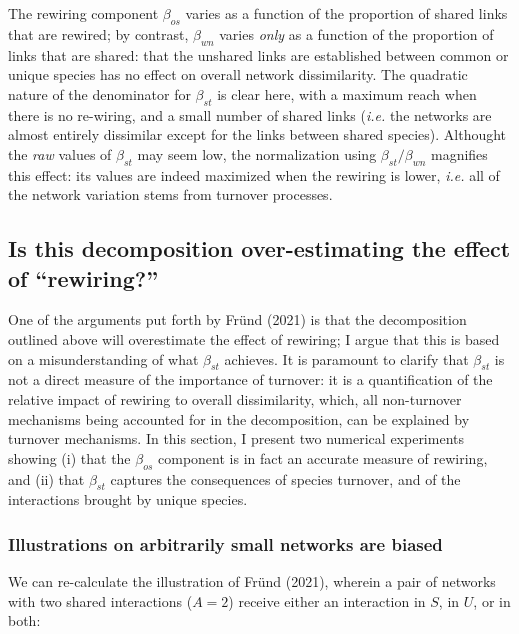 \documentclass[11pt]{article}
\begin{document}
The rewiring component \(\beta_{os}\) varies as a function of the
proportion of shared links that are rewired; by contrast, \(\beta_{wn}\)
varies \emph{only} as a function of the proportion of links that are
shared: that the unshared links are established between common or unique
species has no effect on overall network dissimilarity. The quadratic
nature of the denominator for \(\beta_{st}\) is clear here, with a
maximum reach when there is no re-wiring, and a small number of shared
links (\emph{i.e.} the networks are almost entirely dissimilar except
for the links between shared species). Althought the \emph{raw} values
of \(\beta_{st}\) may seem low, the normalization using
\(\beta_{st}/\beta_{wn}\) magnifies this effect: its values are indeed
maximized when the rewiring is lower, \emph{i.e.} all of the network
variation stems from turnover processes.

\hypertarget{is-this-decomposition-over-estimating-the-effect-of-rewiring}{%
\subsection{Is this decomposition over-estimating the effect of
``rewiring?''}\label{is-this-decomposition-over-estimating-the-effect-of-rewiring}}

One of the arguments put forth by Fründ (2021) is that the decomposition
outlined above will overestimate the effect of rewiring; I argue that
this is based on a misunderstanding of what \(\beta_{st}\) achieves. It
is paramount to clarify that \(\beta_{st}\) is not a direct measure of
the importance of turnover: it is a quantification of the relative
impact of rewiring to overall dissimilarity, which, all non-turnover
mechanisms being accounted for in the decomposition, can be explained by
turnover mechanisms. In this section, I present two numerical
experiments showing (i) that the \(\beta_{os}\) component is in fact an
accurate measure of rewiring, and (ii) that \(\beta_{st}\) captures the
consequences of species turnover, and of the interactions brought by
unique species.

\hypertarget{illustrations-on-arbitrarily-small-networks-are-biased}{%
\subsubsection{Illustrations on arbitrarily small networks are
biased}\label{illustrations-on-arbitrarily-small-networks-are-biased}}

We can re-calculate the illustration of Fründ (2021), wherein a pair of
networks with two shared interactions (\(A = 2\)) receive either an
interaction in \(S\), in \(U\), or in both:
\end{document}
